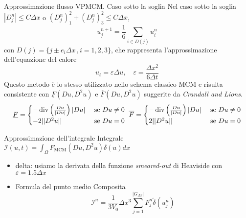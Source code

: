 \begin{frame}{Approssimazione flusso VPMCM. Caso sotto la soglia}
  Nel caso sotto la soglia $|D_j^n|\leq C\Delta x$ o
  $(D_j^n)_1^2+(D_j^n)_3^2\leq C\Delta x$, 
  \[
  u_j^{n+1}=\frac{1}{6}\sum_{i\in D(j)}u_i^n
  \]
con $D(j)=\{j\pm e_i\Delta x\,,i=1,2,3\}$, che rappresenta
l'approssimazione dell'equazione del calore
\[
u_t=\varepsilon \Delta u,\quad \varepsilon=\frac{\Delta x^2}{6\Delta t}
\]
Questo metodo è lo stesso utilizzato nello schema classico MCM e 
risulta consistente con $\underline{F}(Du,D^2u)$ e
$\overline{F}(Du,D^2u)$ suggerite da \emph{Crandall and Lions}.
\[
\underline{F}=
\begin{cases}
-\operatorname{div}\left(\frac{Du}{|Du|}\right)|Du| &\text{ se }Du\neq 0\\
-2||D^2u|| &\text{ se }Du=0
\end{cases}\,\,
\overline{F}=
\begin{cases}
-\operatorname{div}\left(\frac{Du}{|Du|}\right)|Du| &\text{ se }Du\neq 0\\
2||D^2u|| &\text{ se }Du=0
\end{cases}
\]
\end{frame}

\begin{frame}{Approssimazione dell'integrale}
  Integrale $\mathcal{I}(u,t)=\int_{\Omega}F_{\text{MCM}}(Du,D^2u)\delta(u)dx$
  \begin{itemize}
    \item delta: usiamo la derivata della funzione
      \emph{smeared-out} di Heaviside con $\varepsilon=1.5\Delta x$
        \item Formula del punto medio Composita
          \[
          \mathcal{I}^n=\frac{1}{3V_0}\Delta x^3\sum_{j=1}^{|G_{\Delta x}|}F_j^n\tilde{\delta}(u_j^n)
          \]
  \end{itemize}
\end{frame}


